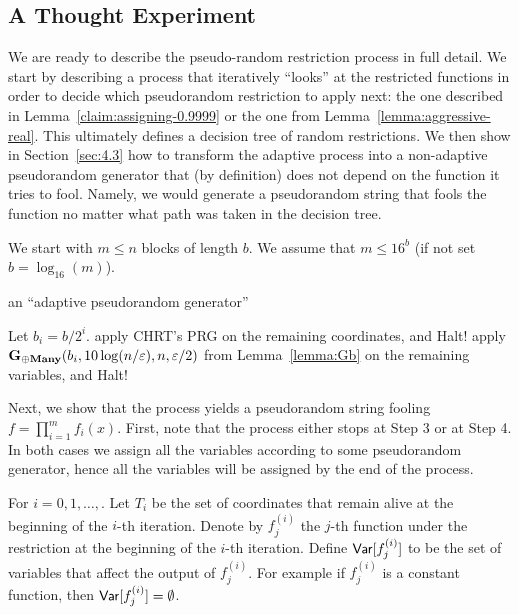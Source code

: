 \subsection{A Thought Experiment}\label{sec:4.2}
We are ready to describe the pseudo-random restriction process in full detail.
We start by describing a process that iteratively ``looks'' at the restricted functions in order to decide which pseudorandom restriction to apply next: the one described in Lemma~\ref{claim:assigning-0.9999} or the one from Lemma~\ref{lemma:aggressive-real}.
This ultimately defines a decision tree of random restrictions.
We then show in Section~\ref{sec:4.3} how to transform the adaptive process into a non-adaptive pseudorandom generator that (by definition) does not depend on the function it tries to fool.
Namely, we would generate a pseudorandom string that  fools the function no matter what path was taken in the decision tree.


We start with $m \le n$ blocks of length $b$.
We assume that $m \le 16^b$ (if not set $b= \log_{16}(m)$).
\begin{algorithm}[H]
\caption{an ``adaptive pseudorandom generator''} 
\begin{algorithmic}[1]
\State Let $b_i = b/2^i$.
apply CHRT's PRG on the remaining coordinates, and Halt!
\EndIf
{} 
apply $\mathbf{G_{\oplus Many}}(b_i,10\log(n/\varepsilon),n,\varepsilon/2)$ from Lemma~\ref{lemma:Gb} on the remaining variables, and Halt!
\EndIf
\EndFor
\end{algorithmic}\label{alg:adaptive}
\end{algorithm}

Next, we show that the process yields a pseudorandom string fooling $f = \prod_{i=1}^m{f_i(x)}$.
First, note that the process either stops at Step 3 or at Step 4. In both cases we assign all the variables according to some pseudorandom generator, hence all the variables will be assigned by the end of the process.

For $i=0,1, \ldots, $.
Let $T_i$ be the set of coordinates that remain alive at the beginning of the $i$-th iteration.
Denote by $f_j^{(i)}$ the $j$-th function under the restriction at the beginning of the $i$-th iteration. 
Define $\mathsf{Var}[f_j^{(i)}]$ to be the set of variables that affect the output of $f_j^{(i)}$.
For example if $f_j^{(i)}$ is a constant function, then $\mathsf{Var}[f_j^{(i)}] = \emptyset$.

